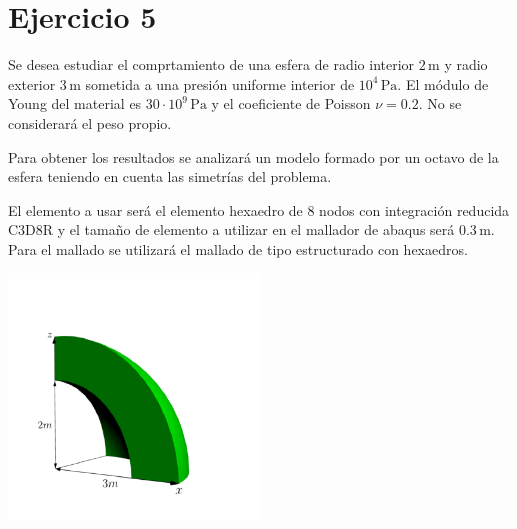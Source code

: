 \documentclass[a4paper,12pt]{article}
\begin{document}
\clearpage
\section{Ejercicio 5}

Se desea estudiar el comprtamiento de una esfera de radio interior $2\,\text{m}$ y radio exterior $3\,\text{m}$ sometida a una presión uniforme interior de $10^{4}\,\text{Pa}$. 
El módulo de Young del material es $30\cdot10^{9}\,\text{Pa}$ y  el coeficiente de Poisson $\nu=0.2$. No se 
considerará el peso propio.

Para obtener los resultados se analizará un modelo formado por un octavo de la esfera teniendo en cuenta las
simetrías del problema.

El elemento a usar será el elemento hexaedro de 8 nodos con integración reducida C3D8R y el tamaño de elemento a utilizar 
en el mallador de abaqus será $0.3\, \text{m}$.
Para el mallado se utilizará el mallado de tipo estructurado con hexaedros.


\begin{center}
	\includegraphics[width=0.5\textwidth]{figs/deposito_esfer.pdf}
\end{center}
\vspace{1.5mm}
\end{document}
